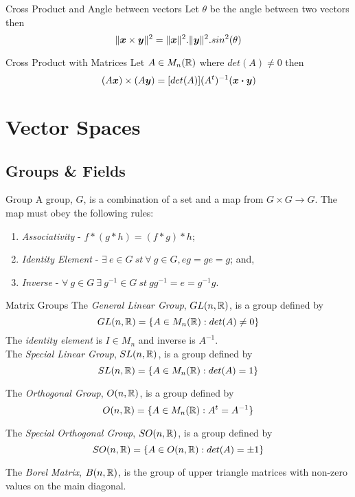 \documentclass[11pt,a4paper]{article}
\begin{document}
\subtitle{Theorem 6.17 - }{Cross Product and Angle between vectors}
Let $\theta$ be the angle between two vectors then
$$\|\boldsymbol{x} \times  \boldsymbol{y}\|^2 = \|\boldsymbol{x}\|^2.\|\boldsymbol{y}\|^2.sin^2(\theta)$$

\subtitle{Theorem 6.18 - }{Cross Product with Matrices}
Let $A \in M_n(\mathbb{R})$ where $det(A) \not = 0$ then
$$(A\boldsymbol{x}) \times (A\boldsymbol{y}) = [det(A)](A^t)^{-1}(\boldsymbol{x} \boldsymbol{\cdot} \boldsymbol{y})$$

\section{Vector Spaces}

\subsection{Groups \& Fields}

\subtitle{Definition 7.01 - }{Group}
A group, $G$, is a combination of a set and a map from $G \times G \to G$. The map must obey the following rules:
\begin{enumerate}[label=\roman*)]
  \item \textit{Associativity} - $f * (g * h) = (f * g) * h$;
  \item \textit{Identity Element} - $\exists\ e \in G\ st\ \forall\ g \in G, eg = ge = g$; and,
  \item \textit{Inverse} - $\forall\ g \in G\ \exists\ g^{-1} \in G\ st\ gg^{-1} = e = g^{-1}g$.
\end{enumerate}

\subtitle{Definition 7.02 - }{Matrix Groups}
The \textit{General Linear Group}, $GL(n, \mathbb{R})$, is a group defined by $$GL(n ,\mathbb{R}) = \{A \in M_n(\mathbb{R}) : det(A) \not = 0\}$$
The \textit{identity element} is $I \in M_n$ and inverse is $A^{-1}$. \\

The \textit{Special Linear Group}, $SL(n, \mathbb{R})$, is a group defined by $$SL(n ,\mathbb{R}) = \{A \in M_n(\mathbb{R}) : det(A) = 1\}$$

The \textit{Orthogonal Group}, $O(n, \mathbb{R})$, is a group defined by $$O(n ,\mathbb{R}) = \{A \in M_n(\mathbb{R}) : A^t = A^{-1}\}$$

The \textit{Special Orthogonal Group}, $SO(n, \mathbb{R})$, is a group defined by $$SO(n ,\mathbb{R}) = \{A \in O(n, \mathbb{R}) : det(A) = \pm 1\}$$

The \textit{Borel Matrix}, $B(n, \mathbb{R})$, is the group of upper triangle matrices with non-zero values on the main diagonal.\\
\end{document}
